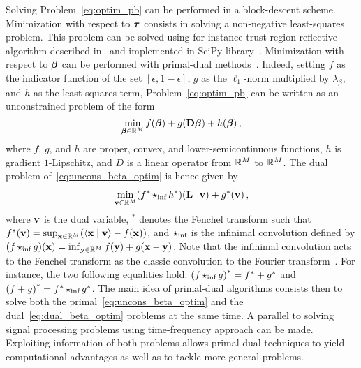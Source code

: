 Solving Problem~\ref{eq:optim_pb} can be performed in a block-descent scheme.
Minimization with respect to $\boldsymbol{\tau}$ consists in solving a non-negative
least-squares problem.
This problem can be solved using for instance trust region reflective algorithm
described in~\cite{Coleman_T_1996_j-siam-j-optim_interior_tranmsb} and implemented
in SciPy library~\cite{Virtanen_P_2020_j-nat-meth_scipy_fascp}.
Minimization with respect to $\boldsymbol{\beta}$ can be performed with primal-dual
methods~\cite{Komodakis_N_2015_j-ieee-sig-proc-mag_playing_d}.
Indeed, setting $f$ as the indicator function of the set $[\epsilon, 1-\epsilon]$, $g$ as
the $\ell_{1}$-norm multiplied by $\lambda_{\beta}$, and $h$ as the least-squares term,
Problem~\ref{eq:optim_pb} can be written as an unconstrained problem of
the form
\begin{equation}
  \label{eq:uncons_beta_optim}
  \min_{\bbeta\in\mathbb{R}^{M}} f(\bbeta) + g(\*D\bbeta) + h(\bbeta) \, ,
\end{equation}
where $f$, $g$, and $h$ are proper, convex, and lower-semicontinuous functions,
$h$ is gradient $1$-Lipschitz, and $D$ is a linear operator from $\mathbb{R}^{M}$ to
$\mathbb{R}^{M}$.
The dual problem of~\eqref{eq:uncons_beta_optim} is hence given by
\begin{equation}
  \label{eq:dual_beta_optim}
  \min_{\*v\in\mathbb{R}^{M}} (f^{*} \iconv h^{*})(\*L^{\top}\*v) + g^{*}(\*v) \, ,
\end{equation}
where $\mathbf{v}$ is the dual variable, ${}^{*}$ denotes the Fenchel transform such
that $f^{*}(\mathbf{v})=\sup_{\mathbf{x}\in\mathbb{R}^{M}}(\left\langle\mathbf{x}\;\middle|\;\mathbf{v}\right\rangle-f(\mathbf{x}))$, and
$\operatorname{\mathbin{\star_{\text{inf}}}}$ is the infinimal convolution defined by
$(f \operatorname{\mathbin{\star_{\text{inf}}}} g)(\mathbf{x}) = \inf_{\mathbf{y}\in\mathbb{R}^{M}} f(\mathbf{y}) + g(\mathbf{x}-\mathbf{y})$.
Note that the infinimal convolution acts to the Fenchel transform as the classic
convolution to the Fourier transform~\cite{Komodakis_N_2015_j-ieee-sig-proc-mag_playing_d}.
For instance, the two following equalities hold:
${(f \operatorname{\mathbin{\star_{\text{inf}}}} g)}^{*} = f^{*} + g^{*}$ and ${(f+g)}^{*} = f^{*} \operatorname{\mathbin{\star_{\text{inf}}}} g^{*}$.
The main idea of primal-dual algorithms consists then to solve both the
primal~\eqref{eq:uncons_beta_optim} and the dual~\eqref{eq:dual_beta_optim}
problems at the same time.
A parallel to solving signal processing problems using time-frequency approach
can be made.
Exploiting information of both problems allows primal-dual techniques to yield
computational advantages as well as to tackle more general problems.

